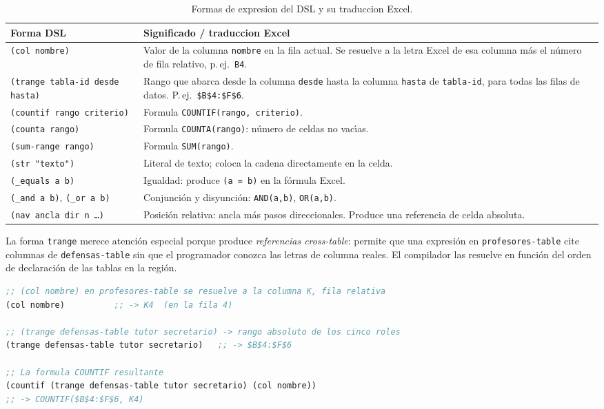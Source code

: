 \documentclass[12pt,a4paper]{report}
\begin{document}
\begin{table}[h!]
\centering
\caption{Formas de expresion del DSL y su traduccion Excel.}
\label{tab:formas-expresion}
\renewcommand{\arraystretch}{1.3}
\begin{tabular}{p{5.5cm} p{8.3cm}}
\hline
\textbf{Forma DSL} & \textbf{Significado / traduccion Excel} \\
\hline
\texttt{(col nombre)}
  & Valor de la columna \texttt{nombre} en la fila actual.
    Se resuelve a la letra Excel de esa columna m\'as el
    n\'umero de fila relativo, p.\,ej.\ \texttt{B4}. \\
\hline
\texttt{(trange tabla-id desde hasta)}
  & Rango que abarca desde la columna \texttt{desde} hasta la
    columna \texttt{hasta} de \texttt{tabla-id}, para todas
    las filas de datos.  P.\,ej.\ \texttt{\$B\$4:\$F\$6}. \\
\hline
\texttt{(countif rango criterio)}
  & Formula \texttt{COUNTIF(rango, criterio)}. \\
\hline
\texttt{(counta rango)}
  & Formula \texttt{COUNTA(rango)}: n\'umero de celdas
    no vac\'{\i}as. \\
\hline
\texttt{(sum-range rango)}
  & Formula \texttt{SUM(rango)}. \\
\hline
\texttt{(str "texto")}
  & Literal de texto; coloca la cadena directamente en la
    celda. \\
\hline
\texttt{(\_equals a b)}
  & Igualdad: produce \texttt{(a = b)} en la f\'ormula Excel. \\
\hline
\texttt{(\_and a b)}, \texttt{(\_or a b)}
  & Conjunci\'on y disyunci\'on:
    \texttt{AND(a,b)}, \texttt{OR(a,b)}. \\
\hline
\texttt{(nav ancla dir n \ldots)}
  & Posici\'on relativa: ancla m\'as pasos direccionales.
    Produce una referencia de celda absoluta. \\
\hline
\end{tabular}
\end{table}

La forma \texttt{trange} merece atenci\'on especial porque produce
\emph{referencias cross-table}: permite que una expresi\'on en
\texttt{profesores-table} cite columnas de \texttt{defensas-table} sin que
el programador conozca las letras de columna reales.  El compilador las
resuelve en funci\'on del orden de declaraci\'on de las tablas en la
regi\'on.

\begin{lstlisting}[language=CommonLisp,
  caption={Expresiones DSL y sus formulas Excel generadas.}]
;; (col nombre) en profesores-table se resuelve a la columna K, fila relativa
(col nombre)          ;; -> K4  (en la fila 4)

;; (trange defensas-table tutor secretario) -> rango absoluto de los cinco roles
(trange defensas-table tutor secretario)   ;; -> $B$4:$F$6

;; La formula COUNTIF resultante
(countif (trange defensas-table tutor secretario) (col nombre))
;; -> COUNTIF($B$4:$F$6, K4)
\end{lstlisting}
\end{document}
